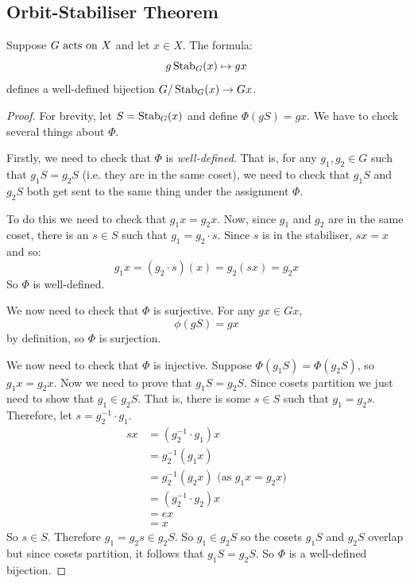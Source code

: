 \documentclass[../main.tex]{subfiles}
\begin{document}
\subsection{Orbit-Stabiliser Theorem}
\begin{theorem}
  \label{orbitStabiliser}
  Suppose $G \text{ acts on } X$ and let $x \in X$.
  The formula:
  \[
    g \operatorname{Stab}_G(x) \mapsto gx
  \]
  defines a well-defined bijection $G / \operatorname{Stab}_G(x) \to Gx$.
\end{theorem}
\begin{proof}
  For brevity, let $S = \operatorname{Stab}_G(x)$ and define $\Phi(gS) = gx$.
  We have to check several things about $\Phi$.

  Firstly, we need to check that $\Phi$ is \textit{well-defined}.
  That is, for any $g_1, g_2 \in G$ such that $g_1S = g_2S$ (i.e. they are in the same coset), we need to check that $g_1S$ and $g_2S$ both get sent to the same thing under the assignment $\Phi$.

  To do this we need to check that $g_1x = g_2x$.
  Now, since $g_1$ and $g_2$ are in the same coset, there is an $s \in S$ such that $g_1 = g_2 \cdot s$.
  Since $s$ is in the stabiliser, $sx = x$ and so:
  \[
    g_1x = (g_2 \cdot s)(x) = g_2(sx) = g_2 x
  \]
  So $\Phi$ is well-defined.

  We now need to check that $\Phi$ is surjective.
  For any $gx \in Gx$,
  \[
    \phi(gS) = gx
  \]
  by definition, so $\Phi$ is surjection.

  We now need to check that $\Phi$ is injective.
  Suppose $\Phi(g_1S) = \Phi(g_2S)$, so $g_1x = g_2x$.
  Now we need to prove that $g_1S = g_2S$.
  Since cosets partition we just need to show that $g_1 \in g_2 S$.
  That is, there is some $s \in S$ such that $g_1 = g_2 s$.
  Therefore, let $s = g^{-1}_{2} \cdot g_1$.
  \begin{align*}
    sx &= (g^{-1}_{2} \cdot g_1)x \\
       &= g^{-1}_{2}(g_1 x) \\
       &= g^{-1}_{2}(g_2 x) \text{ (as $g_1x = g_2x$)}\\
       &= (g^{-1}_{2} \cdot g_2)x \\
       &= ex \\
       &=x
  \end{align*}
  So $s \in S$.
  Therefore $g_1 = g_2 s \in g_2S$.
  So $g_1 \in g_2S$ so the cosets $g_1S$ and $g_2S$ overlap but since cosets partition, it follows that $g_1S = g_2S$.
  So $\Phi$ is a well-defined bijection.
\end{proof}
\end{document}
